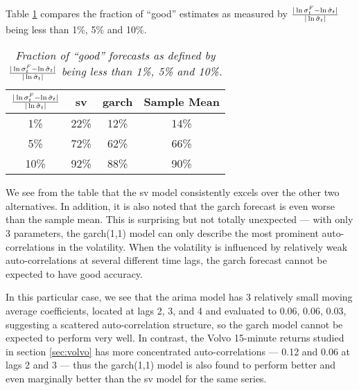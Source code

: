 Table \ref{tab:volvo_good_percentage} compares the fraction of
``good'' estimates as measured by ${|\ln\sigma^F_t -
  \ln\hat{\sigma}_t| \over |\ln \hat{\sigma}_t|}$ being less than 1\%,
5\% and 10\%.
\begin{table}[htb!]
  \centering
  \begin{tabular}{|c|c|c|c|}
    \hline
    ${|\ln \sigma^F_t - \ln \hat{\sigma}_t| \over |\ln
      \hat{\sigma}_t|}$ &
    \gls{sv} & \gls{garch} & Sample Mean \\
    \hline
    1\% & 22\% & 12\% & 14\% \\
    \hline
    5\% & 72\% & 62\% & 66\% \\
    \hline
    10\% & 92\% & 88\% & 90\% \\
    \hline
  \end{tabular}
  \caption{\small \it Fraction of ``good'' forecasts as defined by
    ${|\ln \sigma^F_t - \ln \hat{\sigma}_t| \over |\ln
      \hat{\sigma}_t|}$ being less than 1\%, 5\% and 10\%.}
  \label{tab:volvo_good_percentage}
\end{table}
We see from the table that the \gls{sv} model consistently excels over
the other two alternatives. In addition, it is also noted that the
\gls{garch} forecast is even worse than the sample mean. This is surprising
but not totally unexpected --- with only 3 parameters, the \gls{garch}(1,1)
model can only describe the most prominent auto-correlations in the
volatility. When the volatility is influenced by relatively weak
auto-correlations at several different time lags, the \gls{garch} forecast
cannot be expected to have good accuracy.

In this particular case, we see that the \gls{arima} model has 3 relatively
small moving average coefficients, located at lags 2, 3, and 4 and
evaluated to 0.06, 0.06, 0.03, suggesting a scattered auto-correlation
structure, so the \gls{garch} model cannot be expected to perform very
well. In contrast, the Volvo 15-minute returns studied in
section \ref{sec:volvo} has more concentrated auto-correlations --- 0.12 and
0.06 at lags 2 and 3 --- thus the \gls{garch}(1,1) model is also found to
perform better and even marginally better than the \gls{sv} model for the
same series.

